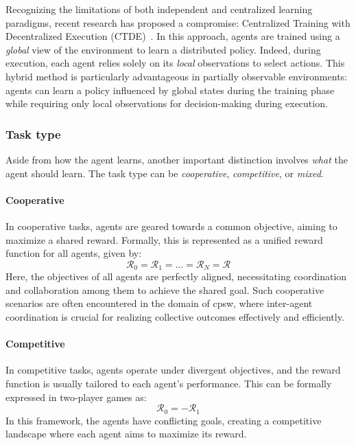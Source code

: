 Recognizing the limitations of both independent and centralized learning paradigms, 
 recent research has proposed a compromise: 
 Centralized Training with Decentralized Execution (CTDE)~\cite{DBLP:conf/nips/LoweWTHAM17}. 
 In this approach, agents are trained using a \emph{global} view of the environment to learn a distributed policy. 
 Indeed, during execution, each agent relies solely on its \emph{local} observations to select actions. 
 This hybrid method is particularly advantageous in partially observable environments: 
 agents can learn a policy influenced by global states during the training phase while requiring only local observations for decision-making during execution.

\subsubsection{Task type}
Aside from how the agent learns, 
 another important distinction involves \emph{what} the agent should learn.
%
The task type can be \emph{cooperative}, \emph{competitive}, or \emph{mixed}.
\paragraph*{Cooperative}
In cooperative tasks, 
 agents are geared towards a common objective, 
 aiming to maximize a shared reward. 
 Formally, this is represented as a unified reward function for all agents, given by:
\begin{equation}
\mathcal{R}_0 = \mathcal{R}_1 = \ldots = \mathcal{R}_N = \mathcal{R}
\end{equation}
Here, the objectives of all agents are perfectly aligned, 
 necessitating coordination and collaboration among them to achieve the shared goal. 
 Such cooperative scenarios are often encountered in the domain of \ac{cpsw}, 
 where inter-agent coordination is crucial for realizing collective outcomes effectively and efficiently.
\paragraph*{Competitive}
In competitive tasks, agents operate under divergent objectives, 
 and the reward function is usually tailored to each agent's performance. 
This can be formally expressed in two-player games as:
\begin{equation}
\mathcal{R}_0 = -\mathcal{R}_1
\end{equation}
In this framework, the agents have conflicting goals, 
 creating a competitive landscape where each agent aims to maximize its reward. 
